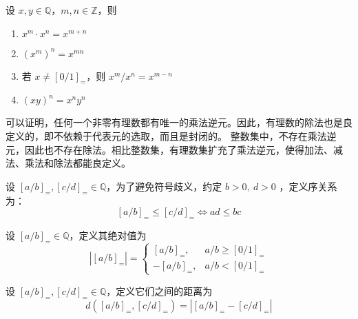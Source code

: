 \begin{theorem}
    设 $x,y\in\mathbb{Q}$，$m,n\in\mathbb{Z}$，则
    \begin{enumerate}
        \item $x^m \cdot x^n = x^{m+n}$
        \item $(x^m)^n = x^{mn}$
        \item 若 $x\neq [0/1]_{=}$，则 $x^m / x^n = x^{m-n}$
        \item $(xy)^n = x^n y^n$
    \end{enumerate}
\end{theorem}

\vspace{1em}

\begin{note}
    可以证明，任何一个非零有理数都有唯一的乘法逆元。因此，有理数的除法也是良定义的，即不依赖于代表元的选取，而且是封闭的。
    整数集中，不存在乘法逆元，因此也不存在除法。相比整数集，有理数集扩充了乘法逆元，使得加法、减法、乘法和除法都能良定义。
\end{note}

\vspace{1em}

\begin{definition}
    设 $[a/b]_{=},[c/d]_{=}\in\mathbb{Q}$，为了避免符号歧义，约定 $b > 0,\ d > 0$ ，定义序关系为：
    \[
        [a/b]_{=} \leq [c/d]_{=} \iff ad \leq bc
    \]
\end{definition}

\begin{definition}
    设 $[a/b]_{=}\in\mathbb{Q}$，定义其绝对值为
    \[
        |[a/b]_{=}| = 
        \begin{cases}
            [a/b]_{=}, & a/b \geq [0/1]_{=} \\
            -[a/b]_{=}, & a/b < [0/1]_{=}
        \end{cases}
    \]
\end{definition}

\begin{definition}
    设 $[a/b]_{=},[c/d]_{=}\in\mathbb{Q}$，定义它们之间的距离为
    \[
        d([a/b]_{=},[c/d]_{=}) = |[a/b]_{=} - [c/d]_{=}|
    \]
\end{definition}

\vspace{1em}

